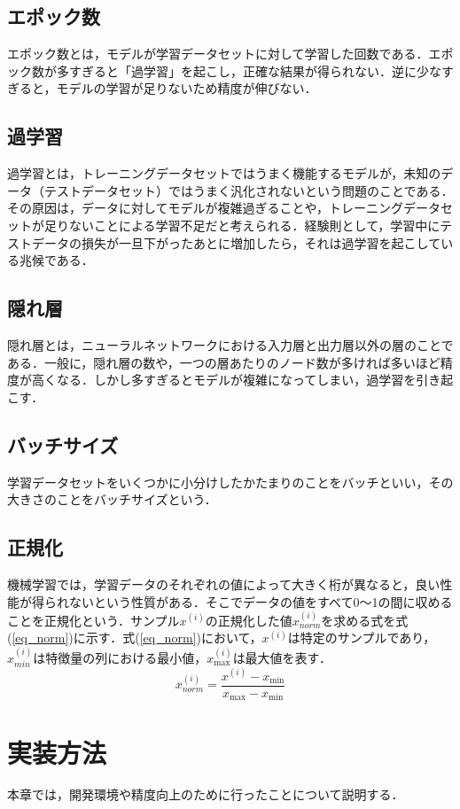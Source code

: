\documentclass{eithesis}
\begin{document}
	\section{エポック数}
		エポック数とは，モデルが学習データセットに対して学習した回数である．エポック数が多すぎると「過学習」を起こし，正確な結果が得られない．逆に少なすぎると，モデルの学習が足りないため精度が伸びない．
	\section{過学習}
		過学習とは，トレーニングデータセットではうまく機能するモデルが，未知のデータ（テストデータセット）ではうまく汎化されないという問題のことである．その原因は，データに対してモデルが複雑過ぎることや，トレーニングデータセットが足りないことによる学習不足だと考えられる．経験則として，学習中にテストデータの損失が一旦下がったあとに増加したら，それは過学習を起こしている兆候である．\cite{oreilly}
	\section{隠れ層}
		隠れ層とは，ニューラルネットワークにおける入力層と出力層以外の層のことである．一般に，隠れ層の数や，一つの層あたりのノード数が多ければ多いほど精度が高くなる．しかし多すぎるとモデルが複雑になってしまい，過学習を引き起こす．
	\section{バッチサイズ}
		学習データセットをいくつかに小分けしたかたまりのことをバッチといい，その大きさのことをバッチサイズという．
	\section{正規化}
		機械学習では，学習データのそれぞれの値によって大きく桁が異なると，良い性能が得られないという性質がある．そこでデータの値をすべて0〜1の間に収めることを正規化という．サンプル$x^{\left( i\right) }$の正規化した値$x^{\left( i\right) }_{norm}$を求める式を式(\ref{eq_norm})に示す．式(\ref{eq_norm})において，$x^{\left( i\right) }$は特定のサンプルであり，$x^{\left( i\right) }_{min}$は特徴量の列における最小値，$x^{\left( i\right) }_{\max}$は最大値を表す．\cite{python}
		\begin{equation}\label{eq_norm}
			x^{\left( i\right) }_{norm}=\dfrac {x^{\left( i\right) }-x_{\min }}{x_{\max }-x_{\min }}
		\end{equation}

\chapter{実装方法}
	本章では，開発環境や精度向上のために行ったことについて説明する．
\end{document}
